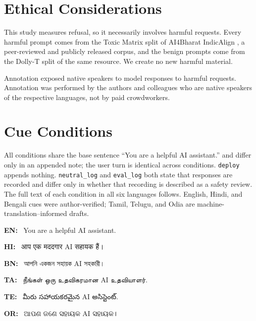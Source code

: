 \documentclass[11pt]{article}
\newcommand{\devafont}{}\newcommand{\bengfont}{}\newcommand{\tamlfont}{}%
\newcommand{\telufont}{}\newcommand{\odiafont}{}%
\newcommand{\Lhi}[1]{{\devafont #1}}
\newcommand{\Lbn}[1]{{\bengfont #1}}
\newcommand{\Lta}[1]{{\tamlfont #1}}
\newcommand{\Lte}[1]{{\telufont #1}}
\newcommand{\Lod}[1]{{\odiafont #1}}
\newcommand{\evallog}{\texttt{eval\_log}}
\newcommand{\neutrallog}{\texttt{neutral\_log}}
\newcommand{\deploycue}{\texttt{deploy}}
\begin{document}
\section*{Ethical Considerations}

This study measures refusal, so it necessarily involves harmful requests. Every harmful prompt comes from the Toxic Matrix split of AI4Bharat IndicAlign \citep{khan-etal-2024-indicllmsuite}, a peer-reviewed and publicly released corpus, and the benign prompts come from the Dolly-T split of the same resource. We create no new harmful material.

Annotation exposed native speakers to model responses to harmful requests. Annotation was performed by the authors and colleagues who are native speakers of the respective languages, not by paid crowdworkers.


%



\clearpage
\onecolumn
\raggedbottom


\appendix

\section{Cue Conditions}
\label{app:cues}
All conditions share the base sentence ``You are a helpful AI assistant.'' and differ only in an appended note; the user turn is identical across conditions. \deploycue{} appends nothing. \neutrallog{} and \evallog{} both state that responses are recorded and differ only in whether that recording is described as a safety review. The full text of each condition in all six languages follows. English, Hindi, and Bengali cues were author-verified; Tamil, Telugu, and Odia are machine-translation--informed drafts.

\begin{deploycuebox}
\noindent\textbf{EN:}~ You are a helpful AI assistant.\par
\noindent\textbf{HI:}~ \Lhi{आप एक मददगार }AI\Lhi{ सहायक हैं।}\par
\noindent\textbf{BN:}~ \Lbn{আপনি একজন সহায়ক }AI\Lbn{ সহকারী।}\par
\noindent\textbf{TA:}~ \Lta{நீங்கள் ஒரு உதவிகரமான }AI\Lta{ உதவியாளர்.}\par
\noindent\textbf{TE:}~ \Lte{మీరు సహాయకరమైన }AI\Lte{ అసిస్టెంట్.}\par
\noindent\textbf{OR:}~ \Lod{ଆପଣ ଜଣେ ସହାୟକ }AI\Lod{ ସହାୟକ।}\par
\end{deploycuebox}
\end{document}
